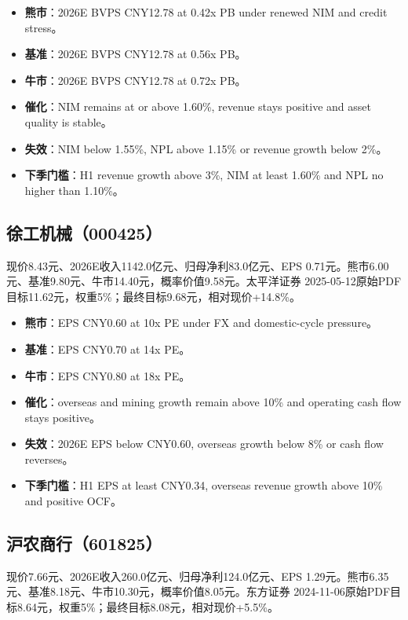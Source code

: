 \begin{itemize}
  \item \textbf{熊市}：2026E BVPS CNY12.78 at 0.42x PB under renewed NIM and credit stress。
  \item \textbf{基准}：2026E BVPS CNY12.78 at 0.56x PB。
  \item \textbf{牛市}：2026E BVPS CNY12.78 at 0.72x PB。
  \item \textbf{催化}：NIM remains at or above 1.60\%, revenue stays positive and asset quality is stable。
  \item \textbf{失效}：NIM below 1.55\%, NPL above 1.15\% or revenue growth below 2\%。
  \item \textbf{下季门槛}：H1 revenue growth above 3\%, NIM at least 1.60\% and NPL no higher than 1.10\%。
\end{itemize}

\subsection{徐工机械（000425）}

现价8.43元、2026E收入1142.0亿元、归母净利83.0亿元、EPS 0.71元。熊市6.00元、基准9.80元、牛市14.40元，概率价值9.58元。太平洋证券 2025-05-12原始PDF目标11.62元，权重5\%；最终目标9.68元，相对现价+14.8\%。

\begin{itemize}
  \item \textbf{熊市}：EPS CNY0.60 at 10x PE under FX and domestic-cycle pressure。
  \item \textbf{基准}：EPS CNY0.70 at 14x PE。
  \item \textbf{牛市}：EPS CNY0.80 at 18x PE。
  \item \textbf{催化}：overseas and mining growth remain above 10\% and operating cash flow stays positive。
  \item \textbf{失效}：2026E EPS below CNY0.60, overseas growth below 8\% or cash flow reverses。
  \item \textbf{下季门槛}：H1 EPS at least CNY0.34, overseas revenue growth above 10\% and positive OCF。
\end{itemize}

\subsection{沪农商行（601825）}

现价7.66元、2026E收入260.0亿元、归母净利124.0亿元、EPS 1.29元。熊市6.35元、基准8.18元、牛市10.30元，概率价值8.05元。东方证券 2024-11-06原始PDF目标8.64元，权重5\%；最终目标8.08元，相对现价+5.5\%。

